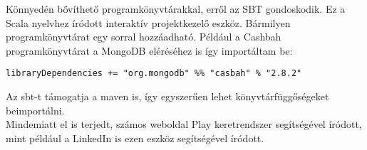 Könnyedén bővíthető programkönyvtárakkal, erről az SBT gondoskodik. Ez a Scala nyelvhez íródott interaktív projektkezelő eszköz. Bármilyen programkönyvtárat egy sorral hozzáadható. Például a Cashbah programkönyvtárat a MongoDB eléréséhez is így importáltam be: 
\begin{verbatim}
libraryDependencies += "org.mongodb" %% "casbah" % "2.8.2"
\end{verbatim}
Az sbt-t támogatja a maven is, így egyszerűen lehet könyvtárfüggőségeket beimportálni.\\
Mindemiatt el is terjedt, számos weboldal Play keretrendszer segítségével íródott, mint például a LinkedIn is ezen eszköz segítségével íródott. 

\newpage